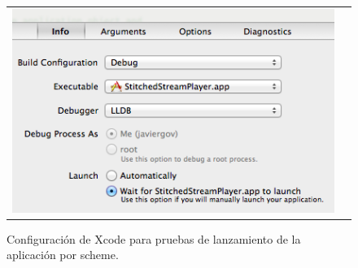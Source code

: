 \enlargethispage{2\baselineskip}
\begin{figure}[H]
	\centering
	\begin{tabular}{cc}
	\includegraphics[scale=0.65]{imgs/xcode-debug-wait.png}
	\end{tabular}
	\caption{Configuración de Xcode para pruebas de lanzamiento de la aplicación por scheme.}
	\label{fig:xcode-debug-wait}
\end{figure}



	

